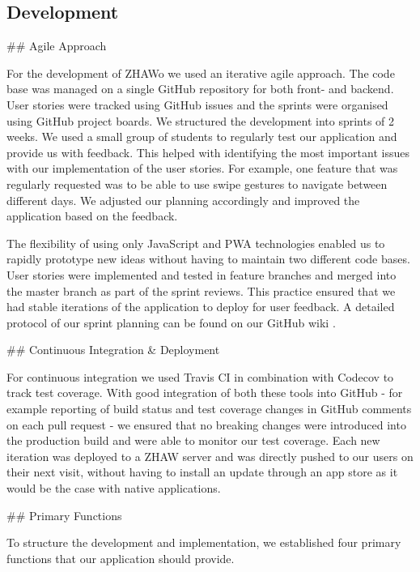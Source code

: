 \begin{markdown}
\section{Development} \label{development}

## Agile Approach

For the development of ZHAWo we used an iterative agile approach. The code base was managed on a single GitHub repository \cite{OurGithub} for both front- and backend. User stories were tracked using GitHub issues and the sprints were organised using GitHub project boards. We structured the development into sprints of 2 weeks. We used a small group of students to regularly test our application and provide us with feedback. This helped with identifying the most important issues with our implementation of the user stories. For example, one feature that was regularly requested was to be able to use swipe gestures to navigate between different days. We adjusted our planning accordingly and improved the application based on the feedback.

The flexibility of using only JavaScript and PWA technologies enabled us to rapidly prototype new ideas without having to maintain two different code bases.
User stories were implemented and tested in feature branches and merged into the master branch as part of the sprint reviews. This practice ensured that we had stable iterations of the application to deploy for user feedback. A detailed protocol of our sprint planning can be found on our GitHub wiki \cite{OurWiki}.

## Continuous Integration \& Deployment

For continuous integration we used Travis CI \cite{Travis} in combination with Codecov \cite{Codecov} to track test coverage. With good integration of both these tools into GitHub - for example reporting of build status and test coverage changes in GitHub comments on each pull request - we ensured that no breaking changes were introduced into the production build and were able to monitor our test coverage.
Each new iteration was deployed to a ZHAW server \cite{OurHost} and was directly pushed to our users on their next visit, without having to install an update through an app store as it would be the case with native applications.

## Primary Functions

To structure the development and implementation, we established four primary functions that our application should provide.


\end{markdown}
